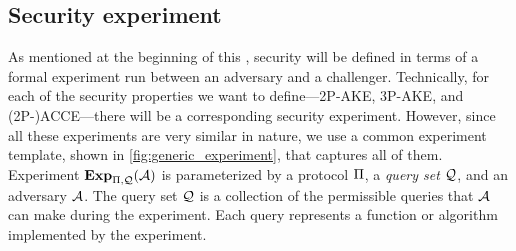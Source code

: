 \subsection{Security experiment}\label{sec:definitions:unified:security_experiment}

As mentioned at the beginning of this ,
security will be defined in terms of a formal experiment run between an adversary and a challenger.
Technically,
for each of the security properties we want to define---2P-AKE, 3P-AKE, and (2P-)ACCE---there 
will be a corresponding security experiment.
However,
since all these experiments are very similar in nature,
we use a common experiment template,
shown in \cref{fig:generic_experiment},
that captures all of them.
Experiment $\mathbf{Exp}_{\mathrm{\Pi},\mathcal{Q}}^{}(\mathcal{A})$ is parameterized by a protocol $\mathrm{\Pi}$,
a \emph{query set} $\mathcal{Q}$,
and an adversary $\mathcal{A}$.
The query set $\mathcal{Q}$ is a collection of the permissible queries that $\mathcal{A}$ can make during the experiment.
Each query represents a function or algorithm implemented by the experiment. 





